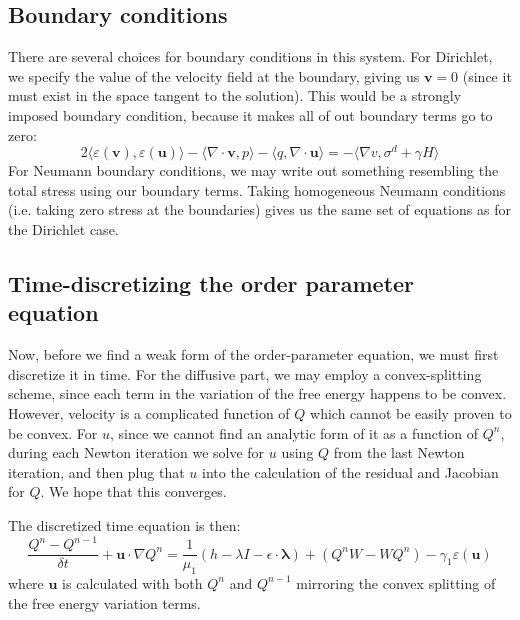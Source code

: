 \documentclass[reqno]{article}
\begin{document}
  \subsection{Boundary conditions}
  There are several choices for boundary conditions in this system.
  For Dirichlet, we specify the value of the velocity field at the boundary,
  giving us $\mathbf{v} = 0$ (since it must exist in the space tangent to the solution).
  This would be a strongly imposed boundary condition, because it makes all of
  out boundary terms go to zero:
  \begin{equation}
    2 \langle \varepsilon(\mathbf{v}), \varepsilon(\mathbf{u}) \rangle
    - \langle \nabla \cdot \mathbf{v}, p \rangle
    - \langle q, \nabla \cdot \mathbf{u} \rangle
    =
    - \langle \nabla v, \sigma^d + \gamma H \rangle
  \end{equation}
  For Neumann boundary conditions, we may write out something resembling the
  total stress using our boundary terms.
  Taking homogeneous Neumann conditions (i.e. taking zero stress at the
  boundaries) gives us the same set of equations as for the Dirichlet case.

  \subsection{Time-discretizing the order parameter equation}
  Now, before we find a weak form of the order-parameter equation, we must first
  discretize it in time.
  For the diffusive part, we may employ a convex-splitting scheme, since each
  term in the variation of the free energy happens to be convex.
  However, velocity is a complicated function of $Q$ which cannot be easily
  proven to be convex.
  For $u$, since we cannot find an analytic form of it as a function of $Q^n$,
  during each Newton iteration we solve for $u$ using $Q$ from the last Newton
  iteration, and then plug that $u$ into the calculation of the residual and
  Jacobian for $Q$.
  We hope that this converges.

  The discretized time equation is then:
  \begin{equation}
    \frac{Q^n - Q^{n - 1}}{\delta t}
    + \mathbf{u} \cdot \nabla Q^n
    =
    \frac{1}{\mu_1} \left( h - \lambda I - \epsilon \cdot \boldsymbol\lambda \right)
    + \left( Q^n W - W Q^n \right)
    - \gamma_1 \varepsilon(\mathbf{u})
  \end{equation}
  where $\mathbf{u}$ is calculated with both $Q^n$ and $Q^{n - 1}$ mirroring the
  convex splitting of the free energy variation terms.
\end{document}
